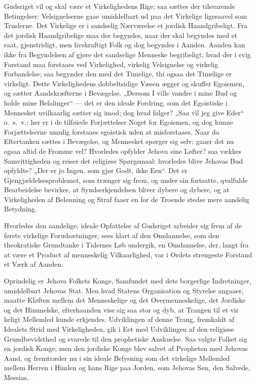\documentclass[12pt]{book}
\begin{document}
Gudsriget vil og skal være et Virkelighedens Rige; saa sættes der
tilsvarende Betingelser: Velsignelserne gaae umiddelbart ud paa det
Virkelige ligesaavel som Truslerne. Det Virkelige er i sandselig
Nærværelse et jordisk Haandgribeligt. Fra det jordisk Haandgribelige
maa der begyndes, naar der skal begyndes med et raat, gjenstridigt,
men livskraftigt Folk og dog begyndes i Aanden. Aanden kan ikke fra
Begyndelsen af gjøre det
sandselige Menneske begribeligt, hvad der i evig Forstand maa
forstaaes ved Virkelighed, virkelig Velsignelse og virkelig
Forbandelse; saa begynder den med det Timelige, thi ogsaa det
Timelige er virkeligt. Dette Virkelighedens dobbeltsidige Væsen
ægger og skuffer Egoismen, og sætter Aandskræfterne i Bevægelse.
„Dersom I ville vandre i mine Bud og holde mine Befalinger“ --- det
er den ideale Fordring, som det Egoistiske i Mennesket uvilkaarlig
sætter sig imod; dog hvad følger? „Saa vil jeg give Eder“ o.\ s.\
v.; her er i de tilføiede Forjættelser Noget for Egoismen, og dog
kunne Forjættelserne umulig forstaaes egoistisk uden at
misforstaaes. Naar da Eftertanken sættes i Bevægelse, og Mennesket
spørger sig selv: gaaer det nu ogsaa altid de Fromme vel? Hvorledes
opfylder Jehova sine Løfter? saa vækkes Samvittigheden og reiser det
religiøse Spørgsmaal: hvorledes blive Jehovas Bud opfyldte? „Der er
jo Ingen, som gjør Godt, ikke Een“. Det er Gjengjældelsesproblemet,
som trænger sig frem, og under sin fortsatte, qvalfulde Bearbeidelse
bevirker, at Syndserkjendelsen bliver dybere og dybere, og at
Virkeligheden af Belønning og Straf faaer en for de Troende stedse
mere aandelig Betydning.

Hvorledes den aandelige, ideale Opfattelse af Gudsriget arbeider sig
frem af de første virkelige Forudsætninger, sees klart af den
Omdannelse, som den theokratiske Grundtanke i Tidernes Løb undergik,
en Omdannelse, der, langt fra at være et Product af menneskelig
Vilkaarlighed, var i Ordets strengeste Forstand et Værk af Aanden.

Oprindelig er Jehova Folkets Konge, Samfundet med dets borgerlige
Indretninger, umiddelbart Jehovas Stat. Men hvad Statens
Organisation og Styrelse angaaer, maatte Kløften mellem det
Menneskelige og det Overmenneskelige, det Jordiske og det
Himmelske, efterhaanden vise sig saa stor og dyb, at Trangen til et
vir\-
keligt Mellemled kunde erkjendes. Udviklingen af denne Trang,
fremkaldt af Idealets Strid med Virkeligheden, gik i Eet med
Udviklingen af den religiøse Grundbevidsthed og svarede til den
prophetiske Anskuelse. Saa valgte Folket sig en jordisk Konge; men
den jordiske Konge blev salvet af Propheten med Jehovas Aand, og
fremtræder nu i sin ideale Belysning som det virkelige Mellemled
mellem Herren i Himlen og hans Rige paa Jorden, som Jehovas Søn, den
Salvede, Messias.
\end{document}
